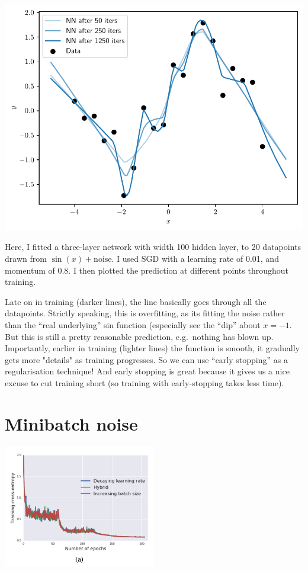 \documentclass{article}
\newcommand{\0}{\mathbf{0}}
\begin{document}
\includegraphics[width=\textwidth]{early_stopping.pdf}

Here, I fitted a three-layer network with width 100 hidden layer, to 20 datapoints drawn from $\sin(x) + \text{noise}$.
I used SGD with a learning rate of 0.01, and momentum of 0.8.
I then plotted the prediction at different points throughout training.

Late on in training (darker lines), the line basically goes through all the datapoints. Strictly speaking, this is overfitting, as its fitting the noise rather than the ``real underlying'' sin function (especially see the ``dip'' about $x=-1$.  
But this is still a pretty reasonable prediction, e.g.\ nothing has blown up.
Importantly, earlier in training (lighter lines) the function is smooth, it gradually gets more "details" as training progresses.
So we can use ``early stopping'' as a regularisation technique!
And early stopping is great because it gives us a nice excuse to cut training short (so training with early-stopping takes less time).

\newpage
\section{Minibatch noise}

\begin{center}
  \includegraphics[width=0.5\textwidth]{schedule.png}
\end{center}
\end{document}

